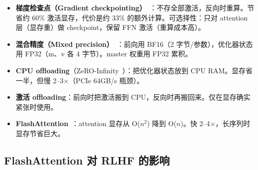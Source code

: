 \begin{itemize}
  \item \textbf{梯度检查点（Gradient checkpointing）}~\cite{chen2016training}：不存全部激活，反向时重算。节省约 60\% 激活显存，代价是约 33\% 的额外计算。可选择性：只对 attention 层（显存重）做 checkpoint，保留 FFN 激活（重算成本高）。
  \item \textbf{混合精度（Mixed precision）}~\cite{micikevicius2018mixed}：前向用 BF16（2 字节/参数），优化器状态用 FP32（m、v 各 4 字节）。master 权重用 FP32 累积。
  \item \textbf{CPU offloading}（ZeRO-Infinity~\cite{rajbhandari2021zeroinfinity}）：把优化器状态放到 CPU RAM。显存省一半，但慢 2--3$\times$（PCIe 64GB/s 瓶颈）。
  \item \textbf{激活 offloading}：前向时把激活搬到 CPU，反向时再搬回来。仅在显存确实紧张时使用。
  \item \textbf{FlashAttention}~\cite{dao2022flashattention, dao2023flashattention2}：attention 显存从 O($n^2$) 降到 O($n$)。快 2--4$\times$，长序列时显存节省巨大。
\end{itemize}

\subsection{FlashAttention 对 RLHF 的影响}
\label{flash-attentions-impact-on-rlhf}

